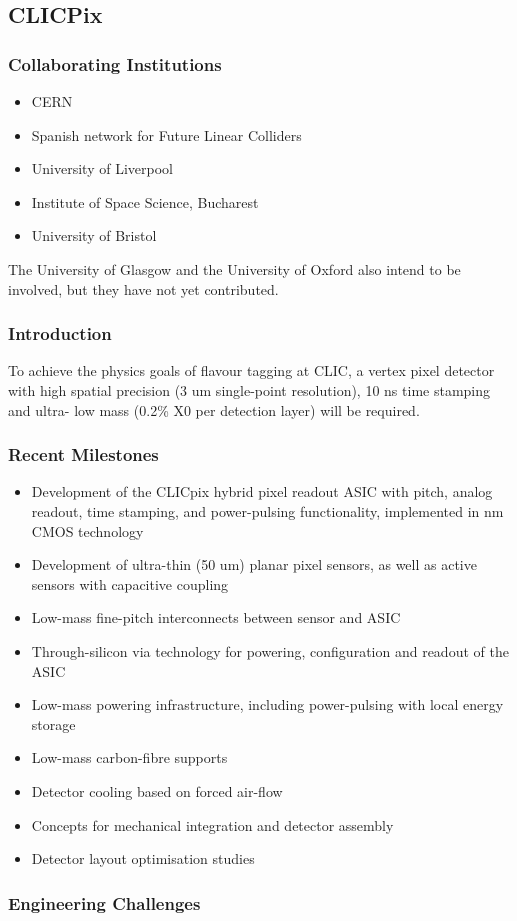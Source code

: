 \subsection{CLICPix}
\subsubsection{Collaborating Institutions}
\begin{itemize}
    \item CERN
    \item Spanish network for Future Linear Colliders
    \item University of Liverpool
    \item Institute of Space Science, Bucharest
    \item University of Bristol
\end{itemize}
The University of Glasgow and the University of Oxford also intend to be involved, but they have not yet contributed.

\subsubsection{Introduction}
To achieve the physics goals of flavour tagging at CLIC, a vertex pixel detector with high spatial precision (3 um single-point resolution), 10 ns time stamping and ultra- low mass (0.2\% X0 per detection layer) will be required.

\subsubsection{Recent Milestones}
\begin{itemize}
\item Development of the CLICpix hybrid pixel readout ASIC with \unit[25]{\micron} pitch, analog readout, time stamping, and power-pulsing functionality, implemented in \unit[65]{nm} CMOS technology
\item Development of ultra-thin (50 um) planar pixel sensors, as well as active sensors with capacitive coupling
\item Low-mass fine-pitch interconnects between sensor and ASIC
\item Through-silicon via technology for powering, configuration and readout of the ASIC
\item Low-mass powering infrastructure, including power-pulsing with local energy storage
\item Low-mass carbon-fibre supports
\item Detector cooling based on forced air-flow
\item Concepts for mechanical integration and detector assembly
\item Detector layout optimisation studies
\end{itemize}

\subsubsection{Engineering Challenges}
